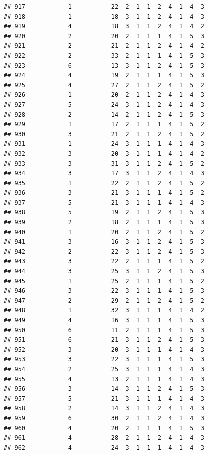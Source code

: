 \documentclass[12pt,]{krantz}
\theoremstyle{definition}
\theoremstyle{definition}
\theoremstyle{remark}
\begin{document}
\begin{verbatim}
## 917            1           22  2  1  1  2  4  1  4  3
## 918            1           18  3  1  1  2  4  1  4  3
## 919            4           18  3  1  1  2  4  1  4  2
## 920            2           20  2  1  1  1  4  1  5  3
## 921            2           21  2  1  1  2  4  1  4  2
## 922            2           33  2  1  1  1  4  1  5  3
## 923            6           13  3  1  1  2  4  1  5  3
## 924            4           19  2  1  1  1  4  1  5  3
## 925            4           27  2  1  1  2  4  1  5  2
## 926            1           20  2  1  1  2  4  1  4  3
## 927            5           24  3  1  1  2  4  1  4  3
## 928            2           14  2  1  1  2  4  1  5  3
## 929            1           17  2  1  1  1  4  1  5  2
## 930            3           21  2  1  1  2  4  1  5  2
## 931            1           24  3  1  1  1  4  1  4  3
## 932            3           20  3  1  1  1  4  1  4  2
## 933            3           31  3  1  1  2  4  1  5  2
## 934            3           17  3  1  1  2  4  1  4  3
## 935            1           22  2  1  1  2  4  1  5  2
## 936            3           21  3  1  1  1  4  1  5  2
## 937            5           21  3  1  1  1  4  1  4  3
## 938            5           19  2  1  1  2  4  1  5  3
## 939            2           18  2  1  1  1  4  1  5  3
## 940            1           20  2  1  1  2  4  1  5  2
## 941            3           16  3  1  1  2  4  1  5  3
## 942            2           22  3  1  1  2  4  1  5  3
## 943            3           22  2  1  1  1  4  1  5  2
## 944            3           25  3  1  1  2  4  1  5  3
## 945            1           25  2  1  1  1  4  1  5  2
## 946            3           22  3  1  1  1  4  1  5  3
## 947            2           29  2  1  1  2  4  1  5  2
## 948            1           32  3  1  1  1  4  1  4  2
## 949            4           16  3  1  1  1  4  1  5  3
## 950            6           11  2  1  1  1  4  1  5  3
## 951            6           21  3  1  1  2  4  1  5  3
## 952            3           20  3  1  1  1  4  1  4  3
## 953            3           22  3  1  1  1  4  1  5  3
## 954            2           25  3  1  1  1  4  1  4  3
## 955            4           13  2  1  1  1  4  1  4  3
## 956            3           14  3  1  1  2  4  1  5  3
## 957            5           21  3  1  1  1  4  1  4  3
## 958            2           14  3  1  1  2  4  1  4  3
## 959            6           30  2  1  1  2  4  1  4  3
## 960            4           20  2  1  1  1  4  1  5  3
## 961            4           28  2  1  1  2  4  1  4  3
## 962            4           24  3  1  1  1  4  1  4  3

\end{verbatim}
\end{document}
